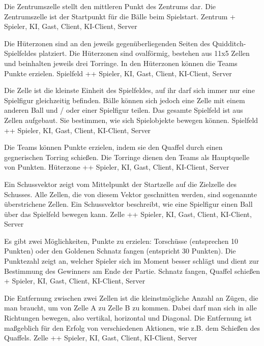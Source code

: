         {Die Zentrumszelle stellt den mittleren Punkt des Zentrums dar.}
        {Die Zentrumszelle ist der Startpunkt für die Bälle beim Spielstart.}
        {Zentrum}
        {+}
        {Spieler, KI, Gast, Client, KI-Client, Server}

        {Die Hüterzonen sind an den jeweils gegenüberliegenden Seiten des Quidditch-Spielfeldes platziert. Die Hüterzonen sind ovalförmig, bestehen aus 11x5 Zellen und beinhalten jeweils drei Torringe.}
        {In den Hüterzonen können die Teams Punkte erzielen.}
        {Spielfeld}
        {++}
        {Spieler, KI, Gast, Client, KI-Client, Server}
        
        {Die Zelle ist die kleinste Einheit des Spielfeldes, auf ihr darf sich immer nur eine Spielfigur gleichzeitig befinden. Bälle können sich jedoch eine Zelle mit einem anderen Ball und / oder einer Spielfigur teilen.}
        {Das gesamte Spielfeld ist aus Zellen aufgebaut. Sie bestimmen, wie sich Spielobjekte bewegen können.}
        {Spielfeld}
        {++}
        {Spieler, KI, Gast, Client, KI-Client, Server}

        {Die Teams können Punkte erzielen, indem sie den Quaffel durch einen gegnerischen Torring schießen.}
        {Die Torringe dienen den Teams als Hauptquelle von Punkten.}
        {Hüterzone}
        {++}
        {Spieler, KI, Gast, Client, KI-Client, Server}
        
        {Ein Schussvektor zeigt vom Mittelpunkt der Startzelle auf die Zielzelle des Schusses. Alle Zellen, die von diesem Vektor geschnitten werden, sind sogenannte überstrichene Zellen.}
        {Ein Schussvektor beschreibt, wie eine Spielfigur einen Ball über das Spielfeld bewegen kann.}
        {Zelle}
        {++}
        {Spieler, KI, Gast, Client, KI-Client, Server}
        
        {Es gibt zwei Möglichkeiten, Punkte zu erzielen: Torschüsse (entsprechen 10 Punkten) oder den Goldenen Schnatz fangen (entspricht 30 Punkten).}
        {Die Punktezahl zeigt an, welcher Spieler sich im Moment besser schlägt und dient zur Bestimmung des Gewinners am Ende der Partie.}
        {Schnatz fangen, Quaffel schießen}
        {+}
        {Spieler, KI, Gast, Client, KI-Client, Server}

        {Die Entfernung zwischen zwei Zellen ist die kleinstmögliche Anzahl an Zügen, die man braucht, um von Zelle A zu Zelle B zu kommen. Dabei darf  man sich in alle Richtungen bewegen, also vertikal, horizontal und Diagonal.}
        {Die Entfernung ist maßgeblich für den Erfolg von verschiedenen Aktionen, wie z.B. dem Schießen des Quaffels.}
        {Zelle}
        {++}
        {Spieler, KI, Gast, Client, KI-Client, Server}

